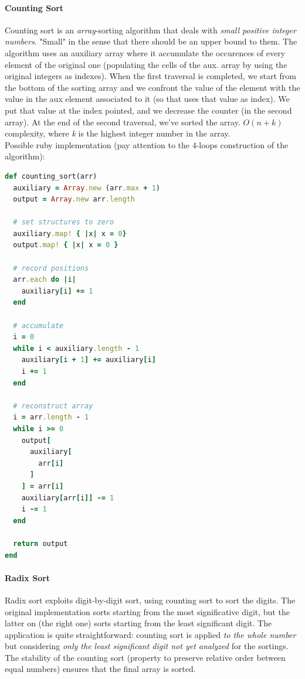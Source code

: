 \documentclass{article}
\begin{document}
			\paragraph{Counting Sort}
				Counting sort is an \textit{array}-sorting algorithm that deals with \textit{small positive integer numbers}. "Small" in the sense that there should be an upper bound to them. The algorithm uses an auxiliary array where it accumulate the occurences of every element of the original one (populating the cells of the aux. array by using the original integers as indexes). When the first traversal is completed, we start from the bottom of the sorting array and we confront the value of the element with the value in the aux element associated to it (so that uses that value as index). We put that value at the index pointed, and we decrease the counter (in the second array). At the end of the second traversal, we've sorted the array. $O(n + k)$ complexity, where \emph{k} is the highest integer number in the array.\\
				Possible ruby implementation (pay attention to the 4-loops construction of the algorithm):
				\begin{lstlisting}[language=Ruby]
def counting_sort(arr)
  auxiliary = Array.new (arr.max + 1)
  output = Array.new arr.length

  # set structures to zero
  auxiliary.map! { |x| x = 0}
  output.map! { |x| x = 0 }

  # record positions
  arr.each do |i|
    auxiliary[i] += 1
  end

  # accumulate
  i = 0
  while i < auxiliary.length - 1
    auxiliary[i + 1] += auxiliary[i]
    i += 1
  end

  # reconstruct array
  i = arr.length - 1
  while i >= 0
    output[
      auxiliary[
        arr[i]
      ]
    ] = arr[i]
    auxiliary[arr[i]] -= 1
    i -= 1
  end

  return output
end
				\end{lstlisting}

			\paragraph{Radix Sort}
				Radix sort exploits digit-by-digit sort, using counting sort to sort the digits. The original implementation sorts starting from the most significative digit, but the latter on (the right one) sorts starting from the least significant digit. The application is quite straightforward: counting sort is applied \textit{to the whole number} but considering \textit{only the least significant digit not yet analyzed} for the sortings. The stability of the counting sort (property to preserve relative order between equal numbers) ensures that the final array is sorted.
\end{document}
